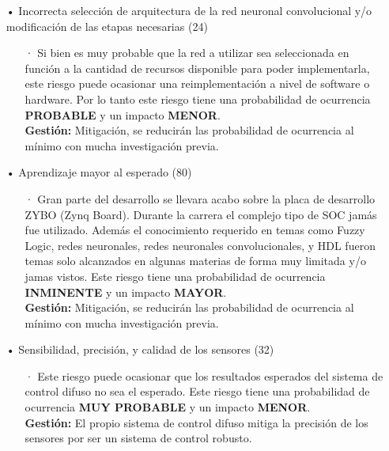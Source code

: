     \begin{itemize}
        \item[•] Incorrecta selección de arquitectura de la red neuronal convolucional y/o modificación de las etapas necesarias (24)
        \begin{itemize}
            \item[·] Si bien es muy probable que la red a utilizar sea seleccionada en función a la cantidad de recursos disponible para poder implementarla, este riesgo puede ocasionar una reimplementación a nivel de software o hardware. Por lo tanto este riesgo tiene una probabilidad de ocurrencia \textbf{PROBABLE} y un impacto \textbf{MENOR}.\\
            \textbf{Gestión:} Mitigación, se reducirán las probabilidad de ocurrencia al mínimo con mucha investigación previa. 
        \end{itemize}
        
        \item[•] Aprendizaje mayor al esperado (80)
        \begin{itemize}
            \item[·] Gran parte del desarrollo se llevara acabo sobre la placa de desarrollo ZYBO (Zynq Board). Durante la carrera el complejo tipo de SOC jamás fue utilizado. 
            Además el conocimiento requerido en temas como Fuzzy Logic, redes neuronales, redes neuronales convolucionales, y HDL fueron temas solo alcanzados en algunas materias de forma muy limitada y/o jamas vistos. Este riesgo tiene una probabilidad de ocurrencia \textbf{INMINENTE} y un impacto \textbf{MAYOR}.\\
            \textbf{Gestión:} Mitigación, se reducirán las probabilidad de ocurrencia al mínimo con mucha investigación previa. 
        \end{itemize}
        
        \item[•] Sensibilidad, precisión, y calidad de los sensores (32)
        \begin{itemize}
            \item[·] Este riesgo puede ocasionar que los resultados esperados del sistema de control difuso no sea el esperado. Este riesgo tiene una probabilidad de ocurrencia \textbf{MUY PROBABLE} y un impacto \textbf{MENOR}.\\
            \textbf{Gestión:} El propio sistema de control difuso mitiga la precisión de los sensores por ser un sistema de control robusto.
        \end{itemize}
        

\end{itemize}
